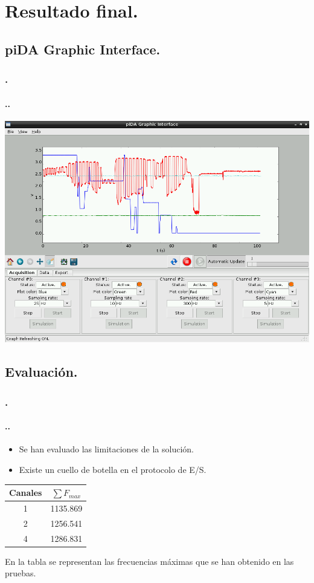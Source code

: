 \documentclass{beamer}
\newenvironment{slide}	%
{\begin{frame}[environment=slide]
\frametitle{\insertsectionnumber.\insertsection}
\framesubtitle{\setlength{\parindent}{2ex} \insertsectionnumber.\insertsubsectionnumber.\insertsubsection}}
{\end{frame}}
\begin{document}
\section{Resultado final.}
\subsection{piDA Graphic Interface.}
\begin{slide}
	\begin{center}
		\includegraphics[scale=0.28]{img/pida_4ch_sample.png}
	\end{center}
\end{slide}

\subsection{Evaluación.}
\begin{slide}

\begin{minipage}{.54\textwidth}
\begin{itemize}
	\item Se han evaluado las limitaciones de la solución.
	\item Existe un cuello de botella en el protocolo de E/S.
\end{itemize}
\end{minipage}
\begin{minipage}{.40\textwidth}
  \begin{tabular}{| c | c |}
  	\hline
  	Canales & $ \sum F_{max} $ 	\\ \hline
  	1			&	1135.869				\\
  	2			&	1256.541				\\
  	4			&	1286.831				\\	 \hline
  \end{tabular}
  \end{minipage}
  
  \vspace{2ex}
  En la tabla se representan las frecuencias máximas que se han obtenido en las pruebas.
\end{slide}
\end{document}
